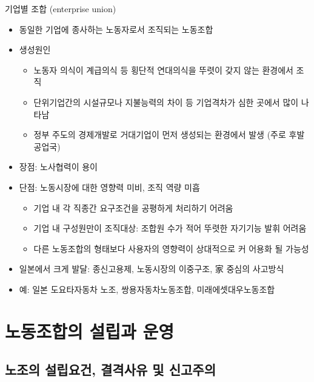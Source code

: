 \documentclass[aspectratio=169,xcolor=dvipsnames,handout]{beamer}
\begin{document}
\begin{frame}[allowframebreaks]{기업별 조합 (enterprise union)}
    \begin{itemize}[<+->]
        \item 동일한 기업에 종사하는 노동자로서 조직되는 노동조합
        \item 생성원인
        \begin{itemize}[<+->]
            \item 노동자 의식이 계급의식 등 횡단적 연대의식을 뚜렷이 갖지 않는 환경에서 조직
            \item 단위기업간의 시설규모나 지불능력의 차이 등 기업격차가 심한 곳에서 많이 나타남
            \item 정부 주도의 경제개발로 거대기업이 먼저 생성되는 환경에서 발생 (주로 후발공업국)
        \end{itemize}
        \framebreak\relax
        \item 장점: 노사협력이 용이
        \item 단점: 노동시장에 대한 영향력 미비, 조직 역량 미흡
        \begin{itemize}[<+->]
            \item 기업 내 각 직종간 요구조건을 공평하게 처리하기 어려움
            \item 기업 내 구성원만이 조직대상: 조합원 수가 적어 뚜렷한 자기기능 발휘 어려움
            \item 다른 노동조합의 형태보다 사용자의 영향력이 상대적으로 커 어용화 될 가능성 
        \end{itemize}
        \item 일본에서 크게 발달: 종신고용제, 노동시장의 이중구조, 家 중심의 사고방식
        \item 예: 일본 도요타자동차 노조, 쌍용자동차노동조합, 미래에셋대우노동조합
    \end{itemize}
\end{frame}

\section{노동조합의 설립과 운영}

\subsection{노조의 설립요건, 결격사유 및 신고주의}
\end{document}

